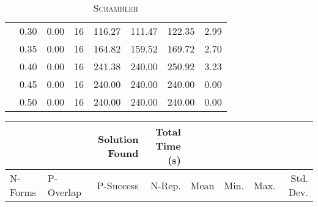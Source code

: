 \documentclass[11pt]{article}
\begin{document}
\begin{table}
\begin{tabular}{llrrrrrr}
    & 0.30 &           0.00 &             16 & 116.27 & 111.47 & 122.35 &      2.99 \\
    & 0.35 &           0.00 &             16 & 164.82 & 159.52 & 169.72 &      2.70 \\
    & 0.40 &           0.00 &             16 & 241.38 & 240.00 & 250.92 &      3.23 \\
    & 0.45 &           0.00 &             16 & 240.00 & 240.00 & 240.00 &      0.00 \\
    & 0.50 &           0.00 &             16 & 240.00 & 240.00 & 240.00 &      0.00 \\
    \bottomrule
  \end{tabular}
  \caption{\textsc{Scrambler}}\label{tab:SC}
\end{table}
\begin{table}
  \begin{tabular}{llrrrrrr}
    \toprule[1.5pt]
    &      & Solution Found & Total Time (s) &        &        &        &           \\
    \midrule
    N-Forms &P-Overlap  &       P-Success &              N-Rep. &   Mean &   Min. &   Max. & Std. Dev. \\


\end{tabular}
\end{table}
\end{document}
